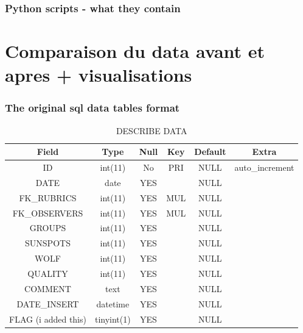 \documentclass[12pt]{article}
\begin{document}
\subsubsection{Python scripts - what they contain}



\section{Comparaison du data avant et apres + visualisations}

\subsubsection{The original sql data tables format}

\begin{table}[h!]
    \centering
    \caption{DESCRIBE DATA}
    \begin{tabular}{c|c|c|c|c|c}%
        \textbf{Field} & \textbf{Type} & \textbf{Null} & \textbf{Key} & \textbf{Default} & \textbf{Extra}  \\
        \hline
        ID & int(11) & No & PRI & NULL & auto\_increment \\
        
        DATE & date & YES && NULL & \\
        
        FK\_RUBRICS & int(11) & YES & MUL & NULL &  \\
        
        FK\_OBSERVERS & int(11) & YES & MUL & NULL &  \\
        
        GROUPS & int(11) & YES && NULL &  \\
        
        SUNSPOTS & int(11) & YES && NULL & \\
        
        WOLF & int(11) & YES && NULL &  \\
        
        QUALITY & int(11) & YES && NULL &  \\
        
        COMMENT & text & YES && NULL &  \\
        
        DATE\_INSERT & datetime & YES && NULL &  \\
        
        FLAG (i added this) & tinyint(1) & YES && NULL &  \\
        
    \end{tabular}
    \label{tab:data-og}
\end{table}
\end{document}
